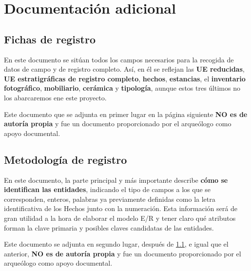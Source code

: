 \chapter{Documentación adicional}
\section{Fichas de registro} \label{sec:registrationforms}
En este documento se sitúan todos los campos necesarios para la recogida de datos de campo
y de registro completo. Así, en él se reflejan las \textbf{UE reducidas}, \textbf{UE
estratigráficas de registro completo},  \textbf{hechos}, \textbf{estancias}, el
\textbf{inventario fotográfico}, \textbf{mobiliario}, \textbf{cerámica} y \textbf{tipología},
aunque estos tres últimos no los abarcaremos ene este proyecto.

Este documento que se adjunta en primer lugar en la página siguiente \textbf{NO es de
autoría propia} y fue un documento proporcionado por el arqueólogo como apoyo documental.

\section{Metodología de registro}
En este documento, la parte principal y más importante describe \textbf{cómo se identifican
las entidades}, indicando el tipo de campos a los que se corresponden, enteros, palabras ya
previamente definidas como la letra identificativa de los Hechos junto con la numeración. Esta
información será de gran utilidad a la hora de elaborar el modelo E/R y tener claro qué
atributos forman la clave primaria y posibles claves candidatas de las entidades.

Este documento se adjunta en segundo lugar, después de \ref{sec:registrationforms}, e
igual que el anterior, \textbf{NO es de autoría propia} y fue un documento proporcionado por
el arqueólogo como apoyo documental.





